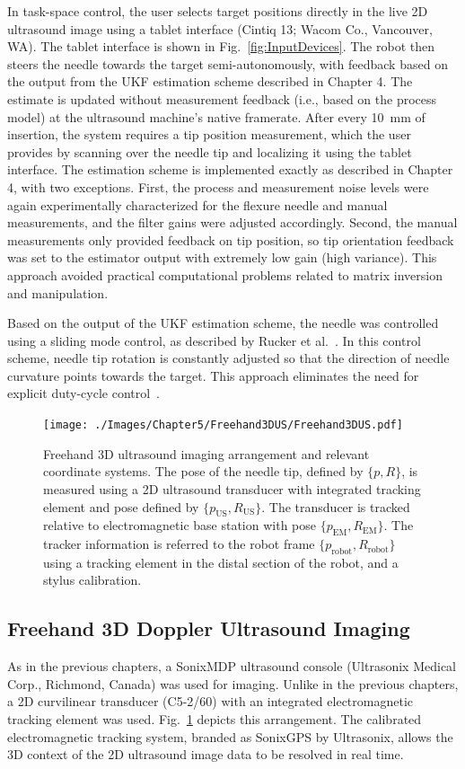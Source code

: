 In task-space control, the user selects target positions directly in the live 2D ultrasound image using a tablet interface (Cintiq 13; Wacom Co., Vancouver, WA). The tablet interface is shown in Fig.~\ref{fig:InputDevices}. The robot then steers the needle towards the target semi-autonomously, with feedback based on the output from the UKF estimation scheme described in Chapter 4. The estimate is updated without measurement feedback (i.e., based on the process model) at the ultrasound machine's native framerate. After every 10~mm of insertion, the system requires a tip position measurement, which the user provides by scanning over the needle tip and localizing it using the tablet interface. The estimation scheme is implemented exactly as described in Chapter 4, with two exceptions. First, the process and measurement noise levels were again experimentally characterized for the flexure needle and manual measurements, and the filter gains were adjusted accordingly. Second, the manual measurements only provided feedback on tip position, so tip orientation feedback was set to the estimator output with extremely low gain (high variance). This approach avoided practical computational problems related to matrix inversion and manipulation. 

Based on the output of the UKF estimation scheme, the needle was controlled using a sliding mode control, as described by Rucker et al.~\cite{Rucker2013}. In this control scheme, needle tip rotation is constantly adjusted so that the direction of needle curvature points towards the target. This approach eliminates the need for explicit duty-cycle control~\cite{Minhas2007}. 

\begin{figure}[!t]
\centering
\texttt{[image: ./Images/Chapter5/Freehand3DUS/Freehand3DUS.pdf]}%
\caption[Freehand 3D ultrasound imaging arrangement]{Freehand 3D ultrasound imaging arrangement and relevant coordinate systems. The pose of the needle tip, defined by $\{p,R\}$, is measured using a 2D ultrasound transducer with integrated tracking element and pose defined by $\{p_{\text{US}},R_{\text{US}}\}$. The transducer is tracked relative to electromagnetic base station with pose $\{p_{\text{EM}},R_{\text{EM}}\}$. The tracker information is referred to the robot frame $\{p_{\text{robot}},R_{\text{robot}}\}$ using a tracking element in the distal section of the robot, and a stylus calibration.}
\label{fig:freehand3DUS}
\end{figure}  

\subsection{Freehand 3D Doppler Ultrasound Imaging}
As in the previous chapters, a SonixMDP ultrasound console (Ultrasonix Medical Corp., Richmond, Canada) was used for imaging. Unlike in the previous chapters, a 2D curvilinear transducer (C5-2/60) with an integrated electromagnetic tracking element was used. Fig.~\ref{fig:freehand3DUS} depicts this arrangement. The calibrated electromagnetic tracking system, branded as SonixGPS by Ultrasonix, allows the 3D context of the 2D ultrasound image data to be resolved in real time. 

